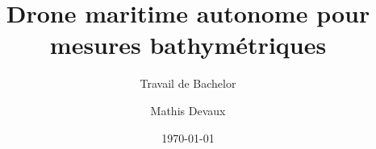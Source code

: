 \author{Mathis Devaux}

\setmale

\title{Drone maritime autonome pour mesures bathymétriques}

\subtitle{Travail de Bachelor}


\date{\today}

